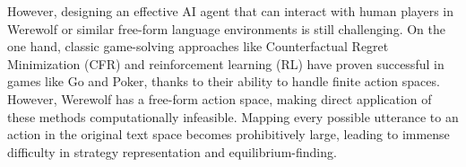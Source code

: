 However, designing an effective AI agent that can interact with human players in Werewolf or similar free-form language environments is still challenging. 
On the one hand, classic game-solving approaches like Counterfactual Regret Minimization (CFR) and reinforcement learning (RL) have proven successful in games like Go and Poker, thanks to their ability to handle finite action spaces. %
However, Werewolf has a free-form action space, making direct application of these methods computationally infeasible.
Mapping every possible utterance to an action in the original text space becomes prohibitively large, leading to immense difficulty in strategy representation and equilibrium-finding. 
